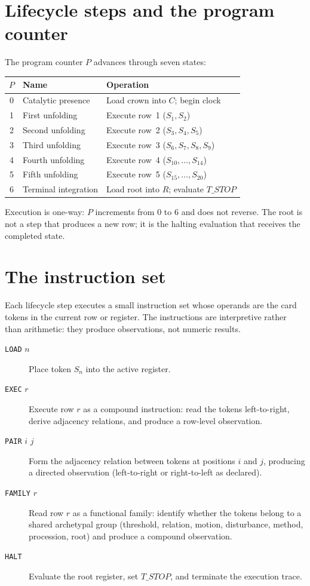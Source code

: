 \section{Lifecycle steps and the program counter}

The program counter $P$ advances through seven states:

\begin{center}
\begin{tabular}{cll}
\toprule
$P$ & Name & Operation \\
\midrule
0 & Catalytic presence & Load crown into $C$; begin clock \\
1 & First unfolding & Execute row~1 ($S_1, S_2$) \\
2 & Second unfolding & Execute row~2 ($S_3, S_4, S_5$) \\
3 & Third unfolding & Execute row~3 ($S_6, S_7, S_8, S_9$) \\
4 & Fourth unfolding & Execute row~4 ($S_{10}, \dots, S_{14}$) \\
5 & Fifth unfolding & Execute row~5 ($S_{15}, \dots, S_{20}$) \\
6 & Terminal integration & Load root into $R$; evaluate $T\_STOP$ \\
\bottomrule
\end{tabular}
\end{center}

Execution is one-way: $P$ increments from $0$ to $6$ and does not reverse.
The root is not a step that produces a new row; it is the halting evaluation
that receives the completed state.

\section{The instruction set}

Each lifecycle step executes a small instruction set whose operands are the
card tokens in the current row or register. The instructions are interpretive
rather than arithmetic: they produce observations, not numeric results.

\begin{description}
\item[\texttt{LOAD} $n$] Place token $S_n$ into the active register.
\item[\texttt{EXEC} $r$] Execute row $r$ as a compound instruction: read the
      tokens left-to-right, derive adjacency relations, and produce a row-level
      observation.
\item[\texttt{PAIR} $i$ $j$] Form the adjacency relation between tokens at
      positions $i$ and $j$, producing a directed observation (left-to-right
      or right-to-left as declared).
\item[\texttt{FAMILY} $r$] Read row $r$ as a functional family: identify
      whether the tokens belong to a shared archetypal group (threshold,
      relation, motion, disturbance, method, procession, root) and produce a
      compound observation.
\item[\texttt{HALT}] Evaluate the root register, set $T\_STOP$, and terminate
      the execution trace.
\end{description}

